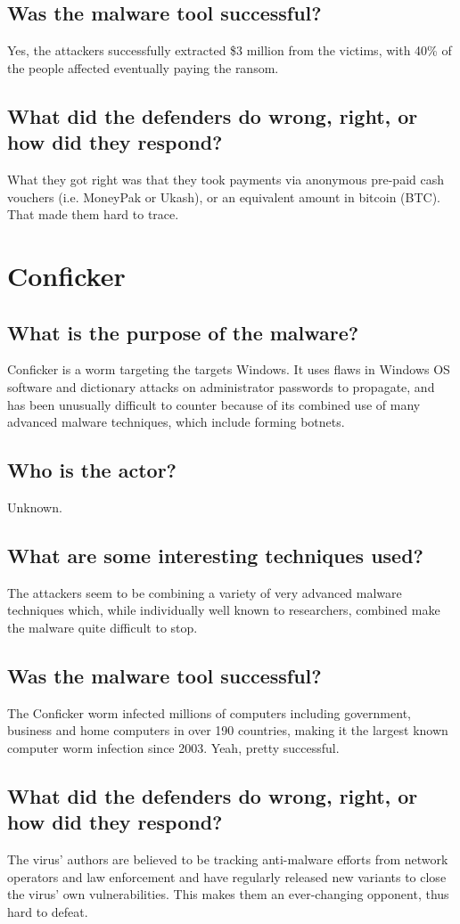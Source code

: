 \documentclass{llncs}
\begin{document}
\subsection{Was the malware tool successful?}
Yes, the attackers successfully extracted \$3 million from the victims, with 40\% of the people affected eventually paying the ransom.
\subsection{What did the defenders do wrong, right, or how did they respond?}
What they got right was that they took payments via anonymous pre-paid cash vouchers (i.e. MoneyPak or Ukash), or an equivalent amount in bitcoin (BTC). That made them hard to trace.


\section{Conficker}

\subsection{What is the purpose of the malware?}
Conficker is a worm targeting the targets Windows. It uses flaws in Windows OS software and dictionary attacks on administrator passwords to propagate, and has been unusually difficult to counter because of its combined use of many advanced malware techniques, which include forming botnets.
\subsection{Who is the actor?}
Unknown.
\subsection{What are some interesting techniques used?}
The attackers seem to be combining a variety of very advanced malware techniques which, while individually well known to researchers, combined make the malware quite difficult to stop. 
\subsection{Was the malware tool successful?}
The Conficker worm infected millions of computers including government, business and home computers in over 190 countries, making it the largest known computer worm infection since 2003. Yeah, pretty successful. 
\subsection{What did the defenders do wrong, right, or how did they respond?}
The virus' authors are believed to be tracking anti-malware efforts from network operators and law enforcement and have regularly released new variants to close the virus' own vulnerabilities. This makes them an ever-changing opponent, thus hard to defeat.
%
%
\end{document}
